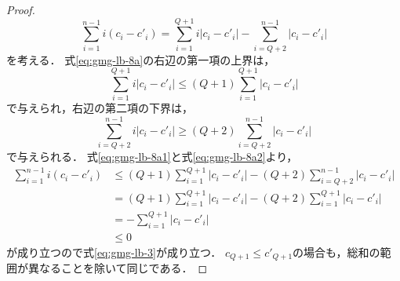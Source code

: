 \begin{proof}
\begin{equation}
    \label{eq:gmg-lb-8a}
    \sum_{i=1}^{n-1}i(c_i-c'_i)=
    \sum_{i=1}^{Q+1}i|c_i-c'_i|-\sum_{i=Q+2}^{n-1}|c_i-c'_i|
  \end{equation}
  を考える．
  式\eqref{eq:gmg-lb-8a}の右辺の第一項の上界は，
  \begin{equation}
    \label{eq:gmg-lb-8a1}
    \sum_{i=1}^{Q+1}i|c_i-c'_i|\leq (Q+1)\sum_{i=1}^{Q+1}|c_i-c'_i|
  \end{equation}
  で与えられ，右辺の第二項の下界は，
  \begin{equation}
    \label{eq:gmg-lb-8a2}
    \sum_{i=Q+2}^{n-1}i|c_i-c'_i|\geq (Q+2)\sum_{i=Q+2}^{n-1}|c_i-c'_i|
  \end{equation}
  で与えられる．  式\eqref{eq:gmg-lb-8a1}と式\eqref{eq:gmg-lb-8a2}より，
  \begin{align*}
    \sum_{i=1}^{n-1}i(c_i-c'_i)
    &\leq (Q+1)\sum_{i=1}^{Q+1}|c_i-c'_i|-(Q+2)\sum_{i=Q+2}^{n-1}|c_i-c'_i| \\
    &= (Q+1)\sum_{i=1}^{Q+1}|c_i-c'_i|-(Q+2)\sum_{i=1}^{Q+1}|c_i-c'_i| \\
    &= -\sum_{i=1}^{Q+1}|c_i-c'_i| \\
    &\leq 0
  \end{align*}
  が成り立つので式\eqref{eq:gmg-lb-3}が成り立つ．
  $c_{Q+1}\leq c'_{Q+1}$の場合も，総和の範囲が異なることを除いて同じである．
\end{proof}

